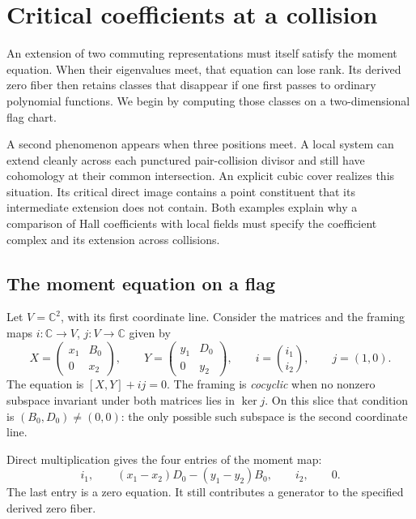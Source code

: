 \chapter{Critical coefficients at a collision}
\label{cycoll:ch}

An extension of two commuting representations must itself satisfy
the moment equation. When their eigenvalues meet, that equation can
lose rank. Its derived zero fiber then retains classes that disappear
if one first passes to ordinary polynomial functions. We begin by
computing those classes on a two-dimensional flag chart.

A second phenomenon appears when three positions meet. A local
system can extend cleanly across each punctured pair-collision
divisor and still have cohomology at their common intersection.
An explicit cubic cover realizes this situation. Its critical
direct image contains a point constituent that its intermediate
extension does not contain. Both examples explain why a comparison
of Hall coefficients with local fields must specify the coefficient
complex and its extension across collisions.

\section{The moment equation on a flag}
\label{cycoll:sec:moment}

Let $V=\mathbb C^2$, with its first coordinate line.
Consider the matrices and the framing maps
$i:\mathbb C\to V$, $j:V\to\mathbb C$ given by
\[
 X=\begin{pmatrix}x_1&B_0\\0&x_2\end{pmatrix},\qquad
 Y=\begin{pmatrix}y_1&D_0\\0&y_2\end{pmatrix},\qquad
 i=\binom{i_1}{i_2},\qquad j=(1,0).
\]
The equation is $[X,Y]+ij=0$. The framing is \emph{cocyclic} when
no nonzero subspace invariant under both matrices lies in $\ker j$.
On this slice that condition is $(B_0,D_0)\ne(0,0)$: the only
possible such subspace is the second coordinate line.

Direct multiplication gives the four entries of the moment map:
\begin{equation}\label{cycoll:eq:four-moments}
 i_1,\qquad (x_1-x_2)D_0-(y_1-y_2)B_0,\qquad i_2,\qquad 0.
\end{equation}
The last entry is a zero equation. It still contributes a generator
to the specified derived zero fiber.

